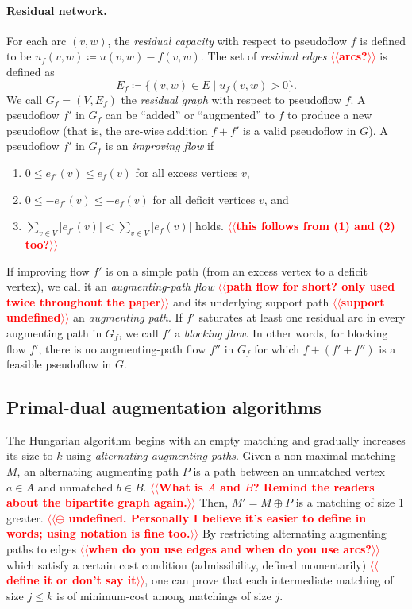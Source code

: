 \documentclass[11pt]{article}
\makeatletter
\theoremstyle{plain}
\numberwithin{figure}{section}
\def\n@te#1{\textsf{\boldmath \textbf{$\langle\!\langle$#1$\rangle\!\rangle$}}\leavevmode}
\def\note#1{\textcolor{red}{\n@te{#1}}}
\makeatother
\begin{document}
\paragraph{Residual network.}
For each arc $(v, w)$, the \emph{residual capacity} with respect to
pseudoflow $f$ is defined to be $u_f(v, w) \coloneqq u(v, w) - f(v, w)$.
The set of \emph{residual edges} \note{arcs?} is defined as
\[
E_f \coloneqq \{(v, w) \in E \mid u_f(v, w) > 0\}.
\]
We call $G_f = (V, E_f)$ the \emph{residual graph} with respect to pseudoflow $f$.
A pseudoflow $f'$ in $G_f$ can be ``added'' or ``augmented'' to $f$ to produce
a new pseudoflow (that is, the arc-wise addition $f + f'$ is a valid pseudoflow
in $G$).
A pseudoflow $f'$ in $G_f$ is an \emph{improving flow} if
\begin{enumerate}[(1)]\itemsep=0pt
\item
$0 \leq e_{f'}(v) \leq e_f(v)$ for all excess vertices $v$,
\item
$0 \leq -e_{f'}(v) \leq -e_f(v)$ for all deficit vertices $v$, and
\item $\sum_{v \in V} |e_{f'}(v)| < \sum_{v \in V} |e_f(v)|$ holds. \note{this follows from (1) and (2) too?}
\end{enumerate}
If improving flow $f'$ is on a simple path (from an excess vertex to a deficit
vertex), we call it an \emph{augmenting-path flow} \note{path flow for short? only used twice throughout the paper} and its underlying support path \note{support undefined} an
\emph{augmenting path}.
If $f'$ saturates at least one residual arc in every augmenting path in $G_f$,
we call $f'$ a \emph{blocking flow}.
In other words, for blocking flow $f'$, there is no augmenting-path flow
$f''$ in $G_f$ for which $f + (f' + f'')$ is a feasible pseudoflow in $G$.

\subsection{Primal-dual augmentation algorithms}

The Hungarian algorithm begins with an empty matching and gradually increases its size to $k$ using \emph{alternating augmenting paths}.
Given a non-maximal matching $M$, an alternating augmenting path $P$ is a path
between an unmatched vertex $a \in A$ and unmatched $b \in B$.
\note{What is $A$ and $B$? Remind the readers about the bipartite graph again.}
Then, $M' = M \oplus P$ is a matching of size 1 greater.
\note{$\oplus$ undefined.  Personally I believe it's easier to define in words; using notation is fine too.}
By restricting alternating augmenting paths to edges \note{when do you use edges and when do you use arcs?}
which satisfy a certain
cost condition (admissibility, defined momentarily) \note{define it or don't say it}, one can prove that each
intermediate matching of size $j \leq k$ is of minimum-cost among matchings of size $j$.
\end{document}
